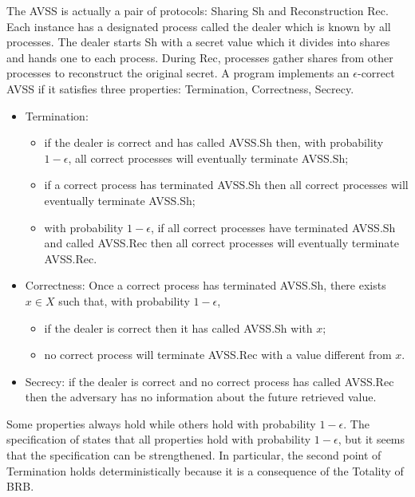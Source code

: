 The \textsf{AVSS} is actually a pair of protocols: Sharing \textsf{Sh} and Reconstruction
\textsf{Rec}.
Each instance has a designated process called the dealer which is known by all processes.
The dealer starts \textsf{Sh} with a secret value which it divides into shares
and hands one to each process. During \textsf{Rec}, processes gather shares
from other processes to reconstruct the original secret.
A program implements an $\epsilon$-correct \textsf{AVSS} if it satisfies three properties:
Termination, Correctness, Secrecy.
\begin{itemize}
    \item Termination:
    \begin{itemize}
        \item if the dealer is correct and has called \textsf{AVSS.Sh} then, with probability 
        $1- \epsilon$, all correct processes will eventually terminate \textsf{AVSS.Sh};
        \item if a correct process has terminated \textsf{AVSS.Sh}
        then all correct processes will eventually terminate \textsf{AVSS.Sh};
        \item with probability $1-\epsilon$, if all correct processes have terminated
        \textsf{AVSS.Sh} and called \textsf{AVSS.Rec}
        then all correct processes will eventually terminate \textsf{AVSS.Rec}.
    \end{itemize}
    \item Correctness: Once a correct process has terminated \textsf{AVSS.Sh},
    there exists $x \in X$ such that, with probability $1-\epsilon$,
    \begin{itemize}
        \item if the dealer is correct then it has called \textsf{AVSS.Sh} with $x$;
        \item no correct process will terminate \textsf{AVSS.Rec}
        with a value different from $x$.
    \end{itemize}
    \item Secrecy: if the dealer is correct and no correct process has called \textsf{AVSS.Rec}
    then the adversary has no information about the future retrieved value.
\end{itemize}
Some properties always hold while others hold with probability $1- \epsilon$.
The specification of \cite{Canetti1993Fast} states that all properties hold with
probability $1-\epsilon$, but it seems that the specification can be strengthened.
In particular, the second point of Termination holds deterministically because it is a
consequence of the Totality of \textsf{BRB}.

